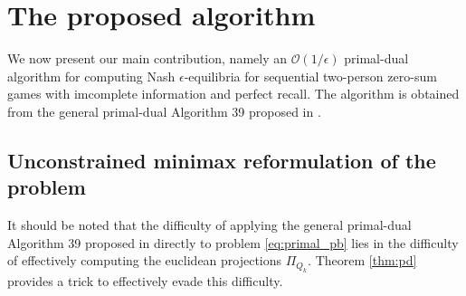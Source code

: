 \documentclass{article} %
\begin{document}
\section{The proposed algorithm}
\label{sec:algo}
We now present our main contribution, namely an $\mathcal{O}(1/\epsilon)$ primal-dual algorithm for computing Nash $\epsilon$-equilibria for sequential two-person zero-sum games with imcomplete information and perfect recall. The algorithm is obtained from the general primal-dual Algorithm 39 proposed in \cite{chambolle2010}.

\subsection{Unconstrained minimax reformulation of the problem}
It should be noted that the difficulty of applying the general primal-dual Algorithm 39 proposed in \cite{chambolle2010} directly to problem \eqref{eq:primal_pb} lies in the difficulty of effectively computing the euclidean projections $\Pi_{Q_k}$. Theorem \ref{thm:pd} provides a trick to effectively evade this difficulty.
\end{document}
